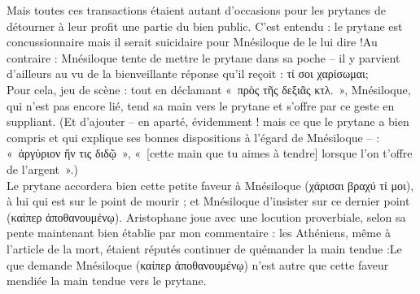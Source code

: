{Mais toutes ces transactions étaient autant d'occasions pour les prytanes de détourner à leur profit une partie du bien public.
C'est entendu : le prytane est concussionnaire mais il serait suicidaire pour Mnésiloque de le lui dire !Au contraire : Mnésiloque tente de mettre le prytane dans sa poche -- il y parvient d'ailleurs au vu de la bienveillante réponse qu'il reçoit : τί σοι χαρίσωμαι;\\
Pour cela, jeu de scène : tout en déclamant «~πρὸς τῆς δεξιᾶς κτλ.~», Mnésiloque, qui n'est pas encore lié, tend sa main vers le prytane et s'offre par ce geste en suppliant. 
(Et d'ajouter -- en aparté, évidemment ! mais ce que le prytane a bien compris et qui explique ses bonnes dispositions à l'égard de Mnésiloque -- : «~ἀργύριον ἤν τις διδῷ~», «~[cette main que tu aimes à tendre] lorsque l'on t'offre de l'argent~».)\\
Le prytane accordera bien cette petite faveur à Mnésiloque (χάρισαι βραχύ τί μοι), à lui qui est sur le point de mourir ; et Mnésiloque d'insister sur ce dernier point (καίπερ ἀποθανουμένῳ).
Aristophane joue avec une locution proverbiale, selon sa pente maintenant bien établie par mon commentaire : les Athéniens, même à l'article de la mort, étaient réputés continuer de quémander la main tendue :Le  que demande Mnésiloque (καίπερ ἀποθανουμένῳ) n'est autre que cette faveur mendiée la main tendue vers le prytane.}
